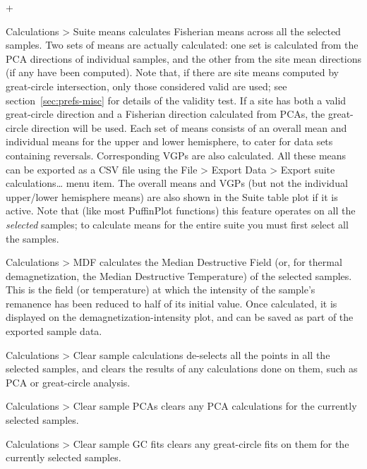 \documentclass[a4paper,british]{article}
\newcommand{\menuitemlabel}[1]{%
\mbox{\textsf{#1}}\hfil}
\newenvironment{menuitemlist}%
{\begin{list}{}{%
\renewcommand{\makelabel}{\menuitemlabel}%
\setlength{\labelwidth}{35pt}%
\setlength{\leftmargin}%
             {\labelwidth+\labelsep}}}%
{\end{list}}
\newcommand{\ppcmd}[1]{\textsf{#1}} %
\newcommand{\caps}[1]{\MakeTextUppercase{#1}} %
\newcommand{\submenu}{ \textgreater{} } %
\begin{document}
\begin{menuitemlist}
\item[Calculations\submenu Suite means] calculates Fisherian means
  across all the selected samples. Two sets of means are actually
  calculated: one set is calculated from the \caps{pca} directions of
  individual samples, and the other from the site mean directions (if
  any have been computed). Note that, if there are site means computed
  by great-circle intersection, only those considered valid are used;
  see section~\ref{sec:prefs-misc} for details of the validity test. If
  a site has both a valid great-circle direction and a Fisherian
  direction calculated from PCAs, the great-circle direction will be
  used. Each set of means consists of an overall mean and individual
  means for the upper and lower hemisphere, to cater for data sets
  containing reversals. Corresponding VGPs are also calculated. All
  these means can be exported as a \caps{csv} file using the
  \ppcmd{File\submenu Export Data\submenu Export suite
    calculations\ldots} menu item. The overall means and VGPs (but not
  the individual upper/lower hemisphere means) are also shown in the
  \ppcmd{Suite table} plot if it is active. Note that (like most
  PuffinPlot functions) this feature operates on all the \emph{selected}
  samples; to calculate means for the entire suite you must first select
  all the samples.

\item[Calculations\submenu MDF] calculates the Median Destructive Field (or,
  for thermal demagnetization, the Median Destructive Temperature) of the
  selected samples. This is the field (or temperature) at which the intensity
  of the sample's remanence has been reduced to half of its initial value.
  Once calculated, it is displayed on the demagnetization-intensity plot, and
  can be saved as part of the exported sample data.

\item[Calculations\submenu Clear sample calculations] de-selects all the
  points in all the selected samples, and clears the results of any
  calculations done on them, such as \caps{pca} or great-circle analysis.

\item[Calculations\submenu Clear sample PCAs] clears any
  \caps{pca} calculations for the currently selected samples.

\item[Calculations\submenu Clear sample GC fits] clears any
  great-circle fits on them for the currently selected samples.


\end{menuitemlist}
\end{document}

